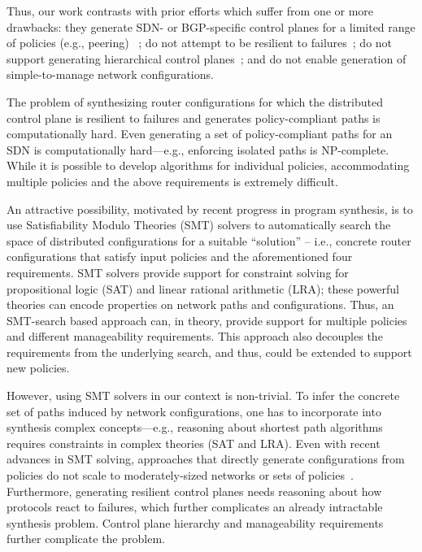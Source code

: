 Thus, our work contrasts with prior efforts which suffer
from one or more drawbacks: they generate SDN- or BGP-specific
control planes for a limited range of policies (e.g., peering)
~\cite{netkat,merlin,netegg,fattire,simple,sol,propane}; do not
attempt to be resilient to failures~\cite{synet}; 
do not support generating
hierarchical control planes~\cite{propane}; 
and do not enable generation of
simple-to-manage network configurations. 

The problem of synthesizing router configurations for which the
distributed control plane is resilient to failures and generates
policy-compliant paths is computationally hard. Even generating a set
of policy-compliant paths for an SDN is computationally hard---e.g.,
enforcing isolated paths is NP-complete. While it is possible to
develop algorithms for individual policies, accommodating multiple
policies and the above requirements is extremely difficult.


An attractive possibility, motivated by recent progress in program
synthesis, is to use
Satisfiability Modulo Theories (SMT) solvers to automatically search
the space of distributed configurations for a suitable ``solution'' --
i.e., concrete router configurations that satisfy input policies and
the aforementioned four requirements. SMT solvers provide support for
constraint solving for propositional logic (SAT) and linear rational
arithmetic (LRA); these powerful theories can  
encode properties on network paths 
and configurations. Thus, an SMT-search based approach can, in theory,
provide support for multiple policies and different manageability requirements. 
This approach also decouples the requirements from the underlying search, 
and thus, could be extended to support new policies. 

However, using SMT solvers in our context is
non-trivial.  To infer the concrete set of paths induced by network
configurations, one has to incorporate into synthesis complex
concepts---e.g., reasoning about shortest path algorithms requires
constraints in complex theories (SAT and LRA).  Even with recent
advances in SMT solving, approaches that directly generate
configurations from policies do not scale to moderately-sized networks
or sets of policies~\cite{synet}. Furthermore, generating resilient
control planes needs reasoning about how protocols react to failures,
which further complicates an already intractable synthesis
problem. Control plane hierarchy and manageability requirements further
complicate the problem.

